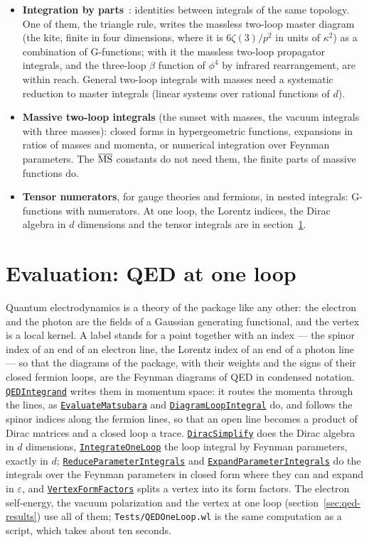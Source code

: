 \documentclass[11pt,a4paper]{article}
\newcommand{\pkg}[1]{\texttt{#1}}
\newcommand{\fnref}[1]{\hyperref[fn:#1]{\pkg{#1}}}
\begin{document}
\begin{itemize}
\item \textbf{Integration by parts}~\cite{ChetyrkinTkachov1981}: identities between integrals of the same topology. One of
  them, the triangle rule, writes the massless two-loop master diagram (the kite, finite in four dimensions, where it is
  $6\zeta(3)/p^2$ in units of $\kappa^2$) as a combination of G-functions; with it the massless two-loop propagator
  integrals, and the three-loop $\beta$ function of $\phi^4$ by infrared rearrangement, are within reach. General two-loop
  integrals with masses need a systematic reduction to master integrals (linear systems over rational functions of $d$).
\item \textbf{Massive two-loop integrals} (the sunset with masses, the vacuum integrals with three masses): closed forms
  in hypergeometric functions, expansions in ratios of masses and momenta, or numerical integration over Feynman
  parameters. The $\overline{\rm MS}$ constants do not need them, the finite parts of massive functions do.
\item \textbf{Tensor numerators}, for gauge theories and fermions, in nested integrals: G-functions with numerators. At one
  loop, the Lorentz indices, the Dirac algebra in $d$ dimensions and the tensor integrals are in section~\ref{sec:qed}.
\end{itemize}

\section{Evaluation: QED at one loop}\label{sec:qed}

Quantum electrodynamics is a theory of the package like any other: the electron and the photon are the fields of a
Gaussian generating functional, and the vertex is a local kernel. A label stands for a point together with an index ---
the spinor index of an end of an electron line, the Lorentz index of an end of a photon line --- so that the diagrams of
the package, with their weights and the signs of their closed fermion loops, are the Feynman diagrams of QED in
condensed notation. \fnref{QEDIntegrand} writes them in momentum space: it routes the momenta through the lines, as
\fnref{EvaluateMatsubara} and \fnref{DiagramLoopIntegral} do, and follows the spinor indices along the fermion lines, so
that an open line becomes a product of Dirac matrices and a closed loop a trace. \fnref{DiracSimplify} does the Dirac
algebra in $d$ dimensions, \fnref{IntegrateOneLoop} the loop integral by Feynman parameters, exactly in $d$;
\fnref{ReduceParameterIntegrals} and \fnref{ExpandParameterIntegrals} do the integrals over the Feynman parameters in
closed form where they can and expand in $\varepsilon$, and \fnref{VertexFormFactors} splits a vertex into its form
factors. The electron self-energy, the vacuum polarization and the vertex at one loop (section~\ref{sec:qed-results})
use all of them; \pkg{Tests/QEDOneLoop.wl} is the same computation as a script, which takes about ten seconds.
\end{document}
